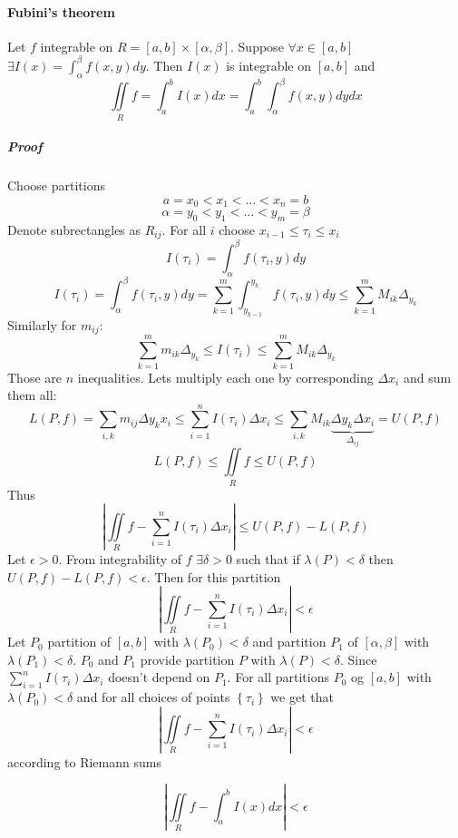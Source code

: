 \paragraph{Fubini's theorem}
Let $f$ integrable on $R = [a,b] \times [\alpha, \beta]$. Suppose $\forall x \in [a,b]$ $\exists I(x) = \int_{\alpha}^\beta  f(x,y) dy$. Then $I(x)$ is integrable on $[a, b]$ and
$$\iint\limits_{R} f = \int_{a}^{b} I(x) dx = \int_a^b  \int_{\alpha}^{\beta} f(x,y) dy dx$$
\subparagraph{Proof}
Choose partitions
$$a=x_0<x_1<\dots<x_n=b$$
$$\alpha = y_0 < y_1 <\dots < y_m = \beta$$
Denote subrectangles as $R_{ij}$. For all $i$ choose $x_{i-1}\leq \tau_i \leq x_i$
$$I(\tau_i) = \int_{\alpha}^{\beta} f(\tau_i,y) dy$$
$$I(\tau_i) = \int_{\alpha }^\beta f(\tau_i, y) dy = \sum_{k=1}^{m} \int_{y_{k-1}}^{y_k} f(\tau_i, y) dy \leq \sum_{k=1}^{m} M_{ik} \Delta_{y_k}$$
Similarly for $m_{ij}$:
$$\sum_{k=1}^m m_{ik}\Delta_{y_k} \leq I(\tau_i) \leq \sum_{k=1}^m M_{ik} \Delta_{y_k}$$
Those are $n$ inequalities. Lets multiply each one by corresponding $\Delta x_i$ and sum them all:
$$L(P,f) = \sum_{i,k} m_{ij}\Delta y_k x_i \leq \sum_{i=1}^n I(\tau_i) \Delta x_i \leq \sum_{i,k} M_{ik} \underbrace{\Delta y_k \Delta x_i }_{\Delta_{ij}} = U(P,f)$$
$$L(P,f) \leq \iint\limits_{R} f \leq U(P,f)$$
Thus
$$\left|\iint\limits_{R} f - \sum_{i=1}^n I(\tau_i) \Delta x_i  \right| \leq U(P,f) - L(P,f)$$
Let $\epsilon > 0$. From integrability of $f$ $\exists \delta > 0$ such that if $\lambda(P) < \delta$ then $U(P,f)-L(P,f)<\epsilon$. Then for this partition
$$\left|\iint\limits_{R} f - \sum_{i=1}^n I(\tau_i) \Delta x_i  \right| < \epsilon$$
Let $P_0$ partition of $[a,b]$ with $\lambda(P_0) < \delta$ and partition  $P_1$ of $[\alpha, \beta]$ with $\lambda(P_1) < \delta$. $P_0$ and $P_1$ provide partition $P$ with $\lambda(P) < \delta$.
Since $\sum_{i=1}^n I(\tau_i) \Delta x_i$ doesn't depend on $P_1$. For all partitions $P_0$ og $[a,b]$ with $\lambda(P_0) < \delta$  and for all choices of points $\left\{ \tau_i \right\}$ we get that 
$$\left|\iint\limits_{R} f - \sum_{i=1}^n I(\tau_i) \Delta x_i  \right| < \epsilon$$
according to Riemann sums

$$\left|\iint\limits_{R} f - \int_a^b I(x) dx \right|< \epsilon$$